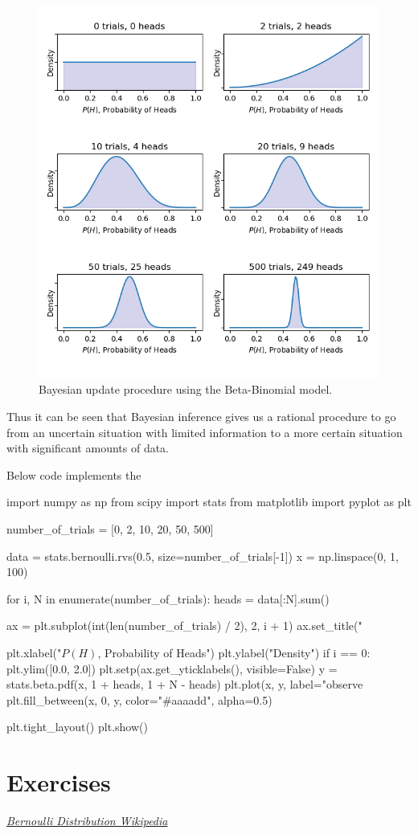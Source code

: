 \begin{figure}[htb]
  \centering
  \includegraphics[width=.7\textwidth]{figures/bayes}
  \caption{Bayesian update procedure using the Beta-Binomial model.}
  \label{fig:bayes}
\end{figure}

Thus it can be seen that Bayesian inference gives us a rational procedure to go from an uncertain situation with limited information to a more certain situation with significant amounts of data.

\begin{finmarkets}
Below code implements the 
\end{finmarkets}

\begin{ipython}
import numpy as np
from scipy import stats
from matplotlib import pyplot as plt

number_of_trials = [0, 2, 10, 20, 50, 500]

data = stats.bernoulli.rvs(0.5, size=number_of_trials[-1])
x = np.linspace(0, 1, 100)

for i, N in enumerate(number_of_trials):
    heads = data[:N].sum()

    ax = plt.subplot(int(len(number_of_trials) / 2), 2, i + 1)
    ax.set_title("%
	
    plt.xlabel("$P(H)$, Probability of Heads")
    plt.ylabel("Density")
    if i == 0:
        plt.ylim([0.0, 2.0])
    plt.setp(ax.get_yticklabels(), visible=False)	
    y = stats.beta.pdf(x, 1 + heads, 1 + N - heads)
    plt.plot(x, y, label="observe %
    plt.fill_between(x, 0, y, color="#aaaadd", alpha=0.5)
    
plt.tight_layout()
plt.show()
\end{ipython}

\section*{Exercises}
%

\begin{thebibliography}{9}
\href{https://en.wikipedia.org/wiki/Bernoulli_distribution}{\emph{Bernoulli Distribution Wikipedia}}
\end{thebibliography}









